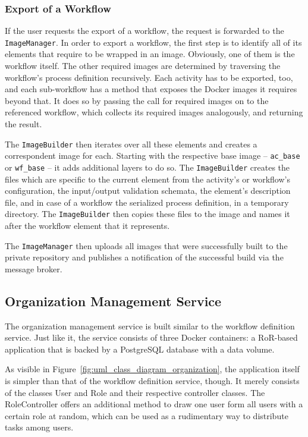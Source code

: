     \subsubsection{Export of a Workflow} %
      \label{ssub:exporting_a_workflow}
      If the user requests the export of a workflow, the request is forwarded to the \texttt{ImageManager}.
      In order to export a workflow, the first step is to identify all of its elements that require to be wrapped in an image. Obviously, one of them is the workflow itself. The other required images are determined by traversing the workflow's process definition recursively. Each activity has to be exported, too, and each sub-workflow has a method that exposes the Docker images it requires beyond that. It does so by passing the call for required images on to the referenced workflow, which collects its required images analogously, and returning the result.

      The \texttt{ImageBuilder} then iterates over all these elements and creates a correspondent image for each. Starting with the respective base image -- \texttt{ac\_base} or \texttt{wf\_base} -- it adds additional layers to do so. The \texttt{ImageBuilder} creates the files which are specific to the current element from the activity's or workflow's configuration, \ie the input/output validation schemata, the element's description file, and in case of a workflow the serialized process definition, in a temporary directory. The \texttt{ImageBuilder} then copies these files to the image and names it after the workflow element that it represents.

      The \texttt{ImageManager} then uploads all images that were successfully built to the private repository and publishes a notification of the successful build via the message broker.

  \subsection{Organization Management Service} %
    \label{sub:organization_management_service}
      The organization management service is built similar to the workflow definition service. Just like it, the service consists of three Docker containers: a \ac{RoR}-based application that is backed by a PostgreSQL database with a data volume.

      As visible in Figure~\ref{fig:uml_class_diagram_organization}, the application itself is simpler than that of the workflow definition service, though. It merely consists of the classes User and Role and their respective controller classes. The RoleController offers an additional method to draw one user form all users with a certain role at random, which can be used as a rudimentary way to distribute tasks among users.

